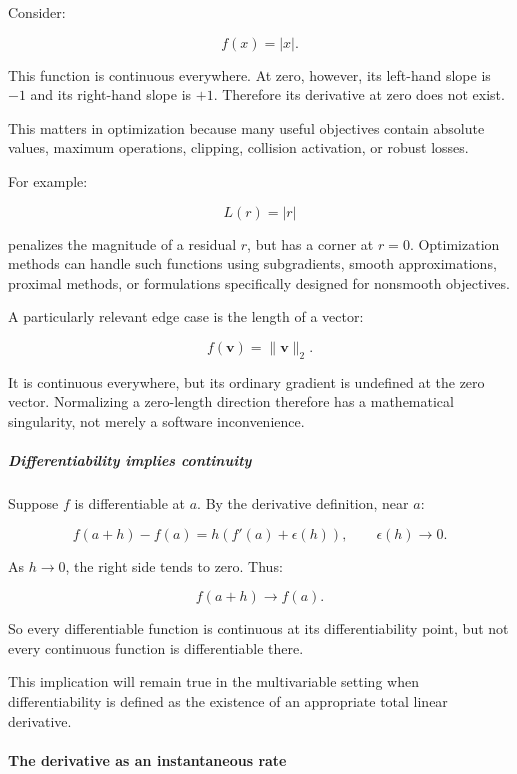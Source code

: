 \hypertarget{01-foundations-i-ch020-continuity-does-not-imply-differentiability}{}

Consider:

\[
f(x)=|x|.
\]

This function is continuous everywhere. At zero, however, its left-hand slope is \(-1\) and its right-hand slope is \(+1\). Therefore its derivative at zero does not exist.

This matters in optimization because many useful objectives contain absolute values, maximum operations, clipping, collision activation, or robust losses.

For example:

\[
L(r)=|r|
\]

penalizes the magnitude of a residual \(r\), but has a corner at \(r=0\). Optimization methods can handle such functions using subgradients, smooth approximations, proximal methods, or formulations specifically designed for nonsmooth objectives.

A particularly relevant edge case is the length of a vector:

\[
f(\mathbf v)=\|\mathbf v\|_2.
\]

It is continuous everywhere, but its ordinary gradient is undefined at the zero vector. Normalizing a zero-length direction therefore has a mathematical singularity, not merely a software inconvenience.

\subparagraph{Differentiability implies continuity}\label{01-foundations-i-ch020-differentiability-implies-continuity}

\hypertarget{01-foundations-i-ch020-differentiability-implies-continuity}{}

Suppose \(f\) is differentiable at \(a\). By the derivative definition, near \(a\):

\[
f(a+h)-f(a) = h\left(f'(a)+\epsilon(h)\right), \qquad \epsilon(h)\to0.
\]

As \(h\to0\), the right side tends to zero. Thus:

\[
f(a+h)\to f(a).
\]

So every differentiable function is continuous at its differentiability point, but not every continuous function is differentiable there.

This implication will remain true in the multivariable setting when differentiability is defined as the existence of an appropriate total linear derivative.

\paragraph{The derivative as an instantaneous rate}\label{01-foundations-i-ch020-the-derivative-as-an-instantaneous-rate}

